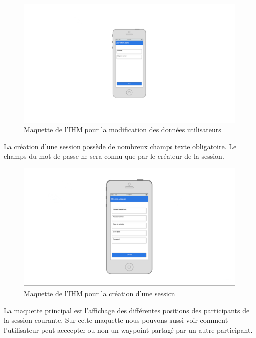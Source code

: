 \documentclass[titlepage, 12pt]{report}
\begin{document}
\begin{figure}[h]
	\caption{Maquette de l'IHM pour la modification des données utilisateurs}
	\label{modify_user_account}
	\centering
	\includegraphics[scale=0.2]{Images/mockups/modify_user_profile.png}
\end{figure}

La création d'une session possède de nombreux champs texte obligatoire. Le champs du mot de passe ne sera connu que par le créateur de la session.

\begin{figure}[h]
	\caption{Maquette de l'IHM pour la création d'une session}
	\label{create_session}
	\centering
	\includegraphics[scale=0.2]{Images/mockups/create_session.png}
\end{figure}

La maquette principal est l'affichage des différentes positions des participants de la session courante. Sur cette maquette nous pouvons aussi voir comment l'utilisateur peut acccepter ou non un waypoint partagé par un autre participant.
\end{document}
